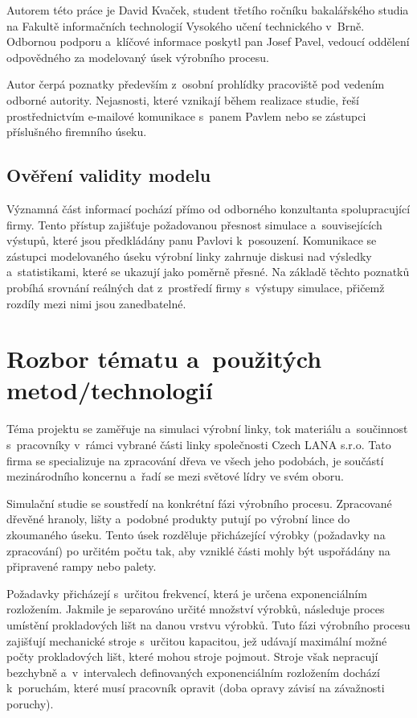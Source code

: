 \documentclass[a4paper, 11pt]{article}
\begin{document}
Autorem této práce je David Kvaček, student třetího ročníku bakalářského studia na Fakultě informačních technologií Vysokého učení technického v~Brně.
Odbornou podporu a~klíčové informace poskytl pan Josef Pavel, vedoucí oddělení odpovědného za modelovaný úsek výrobního procesu.

Autor čerpá poznatky především z~osobní prohlídky pracoviště pod vedením odborné autority.
Nejasnosti, které vznikají během realizace studie, řeší prostřednictvím e-mailové komunikace s~panem Pavlem nebo se zástupci příslušného firemního úseku.

\subsection{Ověření validity modelu}

Významná část informací pochází přímo od odborného konzultanta spolupracující firmy.
Tento přístup zajišťuje požadovanou přesnost simulace a~souvisejících výstupů, které jsou předkládány panu Pavlovi k~posouzení.
Komunikace se zástupci modelovaného úseku výrobní linky zahrnuje diskusi nad výsledky a~statistikami, které se ukazují jako poměrně přesné.
Na základě těchto poznatků probíhá srovnání reálných dat z~prostředí firmy s~výstupy simulace, přičemž rozdíly mezi nimi jsou zanedbatelné.

\newpage

\section{Rozbor tématu a~použitých metod/technologií}

Téma projektu se zaměřuje na simulaci výrobní linky, tok materiálu a~součinnost s~pracovníky v~rámci vybrané části linky společnosti Czech LANA s.r.o.
Tato firma se specializuje na zpracování dřeva ve všech jeho podobách, je součástí mezinárodního koncernu a~řadí se mezi světové lídry ve svém oboru.

Simulační studie se soustředí na konkrétní fázi výrobního procesu.
Zpracované dřevěné hranoly, lišty a~podobné produkty putují po výrobní lince do zkoumaného úseku.
Tento úsek rozděluje přicházející výrobky (požadavky na zpracování) po určitém počtu tak, aby vzniklé části mohly být uspořádány na připravené rampy nebo palety.

Požadavky přicházejí s~určitou frekvencí, která je určena exponenciálním rozložením.
Jakmile je separováno určité množství výrobků, následuje proces umístění prokladových lišt na danou vrstvu výrobků.
Tuto fázi výrobního procesu zajišťují mechanické stroje s~určitou kapacitou, jež udávají maximální možné počty prokladových lišt, které mohou stroje pojmout.
Stroje však nepracují bezchybně a~v~intervalech definovaných exponenciálním rozložením dochází k~poruchám, které musí pracovník opravit (doba opravy závisí na závažnosti poruchy).
\end{document}
